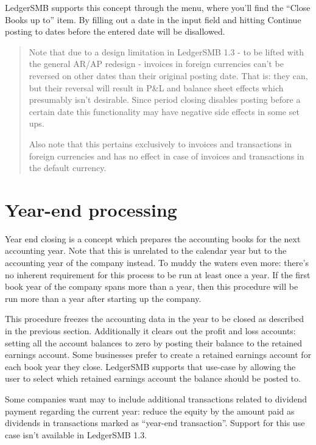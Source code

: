 LedgerSMB supports this concept through the 
menu, where you'll find the ``Close Books up to'' item. By filling out a date
in the input field and hitting Continue posting to dates before the entered
date will be disallowed.


\begin{quotation}
Note that due to a design limitation in LedgerSMB 1.3 - to be lifted with the
general AR/AP redesign - invoices in foreign currencies can't be reversed on
other dates than their original posting date. That is: they can, but their
reversal will result in P\&L and balance sheet effects which presumably isn't
desirable. Since period closing disables posting before a certain date this
functionality may have negative side effects in some set ups.

Also note that this pertains exclusively to invoices and transactions in foreign
currencies and has no effect in case of invoices and transactions in the default
currency.
\end{quotation}

\section{Year-end processing}
\label{sec-business-processes-accounting-year-end-processing}

Year end closing is a concept which prepares the accounting books for the next
accounting year. Note that this is unrelated to the calendar year but to the
accounting year of the company instead. To muddy the waters even more: there's
no inherent requirement for this process to be run at least once a year. If the
first book year of the company spans more than a year, then this procedure will
be run more than a year after starting up the company.

This procedure freezes the accounting data in the year to be closed as described
in the previous section. Additionally it clears out the profit and loss accounts:
setting all the account
balances to zero by posting their balance to the retained earnings account. Some
businesses prefer to create a retained earnings account for each book year they
close. LedgerSMB supports that use-case by allowing the user to select which
retained earnings account the balance should be posted to.

Some companies want may to include additional transactions related to dividend
payment regarding the current year: reduce the equity by the amount paid as
dividends in transactions marked as ``year-end transaction''. Support
for this use case isn't available in LedgerSMB 1.3.

